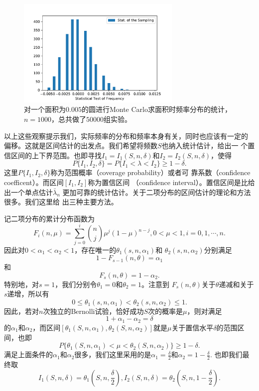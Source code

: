 \begin{figure}[!ht]
\centering
\includegraphics[width=0.7\textwidth]{images/bais_lambda_n.pdf}
\caption{对一个面积为$0.005$的圆进行Monte Carlo求面积时频率分布的统计，
  $n = 1000$，总共做了$50000$组实验。}
\label{fig::bias_lambda_n}
\end{figure}

以上这些观察提示我们，实际频率的分布和频率本身有关，同时也应该有一定的
偏移。这就是区间估计的出发点。我们希望将频数$S$也纳入统计估计，给出一
个置信区间的上下界范围。也即寻找$I_1 = I_1(S, n, \delta)$和$I_2 =
I_2(S, n, \delta)$，使得
$$
P\{I_1, I_2, \delta\} = P\{I_1 < \lambda < I_2\} \geq 1 -\delta.
$$
这里$P\{I_1, I_2, \delta\}$称为范围概率（coverage probability）或者可
靠系数（confidence coefficent）。而区间$[I_1, I_2]$称为置信区间
（confidence interval）。置信区间是比给出一个单点估计$\bar{\lambda}_n$
更加可靠的统计估计。关于二项分布的区间估计的理论和方法很多。我们这里给
出三种主要方法。

记二项分布的累计分布函数为
\begin{equation}
  F_i(n, \mu) = \sum_{j = 0}^i \binom{n}{j} \mu^j (1 - \mu)^{n - j}, 0
  < \mu < 1, i = 0, 1, \cdots, n.
  \label{eq::binomial_CDF}
\end{equation}
因此对$0 < \alpha_1 < \alpha_2 <1$，存在唯一的$\theta_1(s, n, \alpha_1)$和
$\theta_2(s, n, \alpha_2)$分别满足
\begin{equation}
  1 - F_{s - 1}(n, \theta) = \alpha_1
  \label{eq::binomial_theta_1}
\end{equation}
和
\begin{equation}
  F_s(n, \theta) = 1 - \alpha_2.
  \label{eq::binomial_theta_2}
\end{equation}
特别地，对$s = 1$，我们分别令$\theta_1 = 0$和$\theta_2 = 1$。注意到
$F_s(n, \theta)$关于$\theta$递减和关于$s$递增，所以有
$$
0 \leq \theta_1(s, n, \alpha_1) < \theta_2(s, n, \alpha_2) \leq 1.
$$
因此，若对$n$次独立的Bernolli试验，恰好成功$S$次的概率是$\mu$，则对满足
$$
1 + \alpha_1 - \alpha_2 = \delta
$$
的$\alpha_1$和$\alpha_2$，而区间$[\theta_1(S, n, \alpha_1),
  \theta_2(S, n, \alpha_2)]$就是$\mu$关于置信水平$\delta$的范围区间，也即
$$
P\{\theta_1(S, n, \alpha_1) < \mu < \theta_2(S, n, \alpha_2)\} \geq 1 - \delta.
$$
满足上面条件的$\alpha_1$和$\alpha_2$很多，我们这里采用的是$\alpha_1
= \frac{\delta}{2}$和$\alpha_2 = 1 - \frac{\delta}{2}$. 也即我们最终取
$$
I_1(S, n, \delta) = \theta_1(S, n, \frac{\delta}{2}),
I_2(S, n, \delta) = \theta_2(S, n, 1 - \frac{\delta}{2}).
$$

